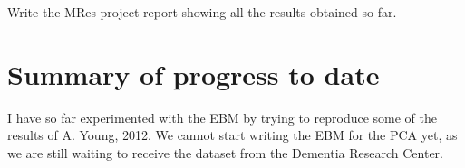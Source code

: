 \documentclass[12pt,a4paper,oneside]{report}
\begin{document}
Write the MRes project report showing all the results obtained so far.




\section*{Summary of progress to date}

I have so far experimented with the EBM by trying to reproduce some of the results of A. Young, 2012. We cannot start writing the EBM for the PCA yet, as we are still waiting to receive the dataset from the Dementia Research Center.
\end{document}
